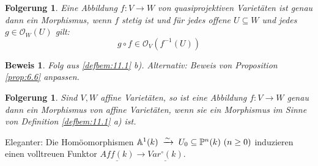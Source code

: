 \documentclass[a4paper,12pt]{report}
\theoremstyle{break}
\newtheorem{Folg}[Def]{Folgerung}
\theoremstyle{nonumberbreak}
\theoremstyle{nonumberplain}
\newtheorem{Bew}{Beweis}
\newcommand{\tomit}[1]{\ensuremath{\DOTSB\;\xrightarrow{#1}\;}}
\begin{document}
\begin{Folg}
  \label{folg:11.2}
  Eine Abbildung $f:V\longrightarrow W$ von quasiprojektiven Varietäten ist genau dann ein Morphismus,
  wenn $f$ stetig ist und für jedes offene $U\subseteq W$ und jedes $g\in \mathcal O_W(U)$ gilt:
  \[
  g\circ f\in\mathcal O_V(f^{-1}(U))
  \]
\end{Folg}
\begin{Bew}
  Folg aus \ref{defbem:11.1} b). Alternativ: Beweis von Proposition \ref{prop:6.6} anpassen.
\end{Bew}
\begin{Folg}
  \label{folg:11.3}
  Sind $V,W$ affine Varietäten, so ist eine Abbildung $f:V\longrightarrow W$ genau dann ein
  Morphismus von affine Varietäten, wenn sie ein Morphismus im Sinne von Definition \ref{defbem:11.1} a) ist.
\end{Folg}
Eleganter: Die Homöomorphismen $\mathbb A^1(k)\tomit{\sim}U_0\subseteq\mathbb P^n(k)\ (n\geq0)$ 
induzieren einen volltreuen Funktor $\underline{Aff(k)}\longrightarrow\underline{Var^\circ(k)}$.

\appendix

\def\indexspace{\par\medskip}
\end{document}
